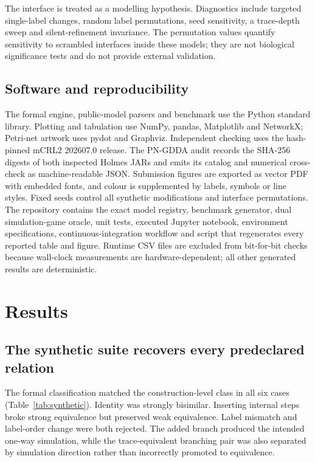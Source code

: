 \documentclass[pdflatex,sn-mathphys-ay]{sn-jnl}
\theoremstyle{definition}
\begin{document}
The interface is treated as a modelling hypothesis. Diagnostics include targeted
single-label changes, random label permutations, seed sensitivity, a trace-depth
sweep and silent-refinement invariance. The permutation values quantify
sensitivity to scrambled interfaces inside these models; they are not biological
significance tests and do not provide external validation.

\subsection{Software and reproducibility}\label{sec:repro-method}

The formal engine, public-model parsers and benchmark use the Python standard
library. Plotting and tabulation use NumPy, pandas, Matplotlib and NetworkX;
Petri-net artwork uses pydot and Graphviz. Independent checking uses the
hash-pinned mCRL2 202607.0 release. The PN-GDDA audit records the SHA-256 digests
of both inspected Holmes JARs and emits its catalog and numerical cross-check as
machine-readable JSON. Submission figures are exported as vector PDF with embedded
fonts, and colour is supplemented by labels, symbols or line styles. Fixed seeds
control all synthetic modifications and interface permutations. The repository contains
the exact model registry, benchmark generator, dual simulation-game oracle,
unit tests, executed Jupyter
notebook, environment specifications, continuous-integration workflow and script
that regenerates every reported table and figure. Runtime CSV files are excluded
from bit-for-bit checks because wall-clock measurements are hardware-dependent;
all other generated results are deterministic.



\section{Results}\label{sec:results}

\subsection{The synthetic suite recovers every predeclared relation}
\label{sec:benchmark-results}

The formal classification matched the construction-level class in all six cases
(Table~\ref{tab:synthetic}). Identity was strongly bisimilar. Inserting internal
steps broke strong equivalence but preserved weak equivalence. Label mismatch and
label-order change were both rejected. The added branch produced the intended
one-way simulation, while the trace-equivalent branching pair was also separated
by simulation direction rather than incorrectly promoted to equivalence.
\end{document}
